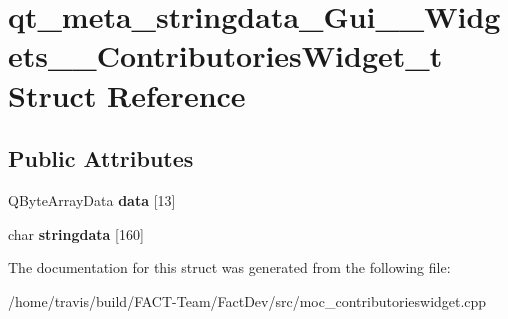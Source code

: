 \hypertarget{structqt__meta__stringdata__Gui____Widgets____ContributoriesWidget__t}{\section{qt\-\_\-meta\-\_\-stringdata\-\_\-\-Gui\-\_\-\-\_\-\-Widgets\-\_\-\-\_\-\-Contributories\-Widget\-\_\-t Struct Reference}
\label{structqt__meta__stringdata__Gui____Widgets____ContributoriesWidget__t}
}
\subsection*{Public Attributes}
\begin{DoxyCompactItemize}
\item 
\hypertarget{structqt__meta__stringdata__Gui____Widgets____ContributoriesWidget__t_a95d762e3198766558af31fecc30ad491}{Q\-Byte\-Array\-Data {\bfseries data} \mbox{[}13\mbox{]}}\label{structqt__meta__stringdata__Gui____Widgets____ContributoriesWidget__t_a95d762e3198766558af31fecc30ad491}

\item 
\hypertarget{structqt__meta__stringdata__Gui____Widgets____ContributoriesWidget__t_a867ace879c11f1f49b205854e067e7a8}{char {\bfseries stringdata} \mbox{[}160\mbox{]}}\label{structqt__meta__stringdata__Gui____Widgets____ContributoriesWidget__t_a867ace879c11f1f49b205854e067e7a8}

\end{DoxyCompactItemize}


The documentation for this struct was generated from the following file\-:\begin{DoxyCompactItemize}
\item 
/home/travis/build/\-F\-A\-C\-T-\/\-Team/\-Fact\-Dev/src/moc\-\_\-contributorieswidget.\-cpp\end{DoxyCompactItemize}
